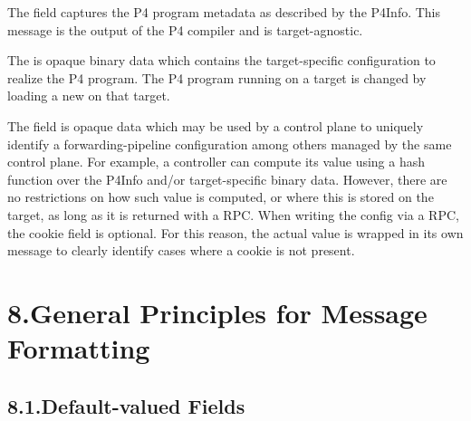 \documentclass[11pt]{article}
\begin{document}
{%
\noindent{}The  field captures the P4 program metadata as described by the P4Info.
This message is the output of the P4 compiler and is target-agnostic.%

The  is opaque binary data which contains the target-specific
configuration to realize the P4 program. The P4 program running on a target is
changed by loading a new  on that target.%

The  field is opaque data which may be used by a control plane to
uniquely identify a forwarding-pipeline configuration among others managed by
the same control plane. For example, a controller can compute its value using a
hash function over the P4Info and/or target-specific binary data. However, there
are no restrictions on how such value is computed, or where this is stored on
the target, as long as it is returned with a  RPC.
When writing the config via a  RPC, the cookie
field is optional. For this reason, the actual value is wrapped in its own
message to clearly identify cases where a cookie is not present.%

\section{8.\hspace*{0.5em}General Principles for Message Formatting}\label{sec-message-formatting-principles}%

\subsection{8.1.\hspace*{0.5em}Default-valued Fields}\label{sec-default-valued-fields}%

}
\end{document}
